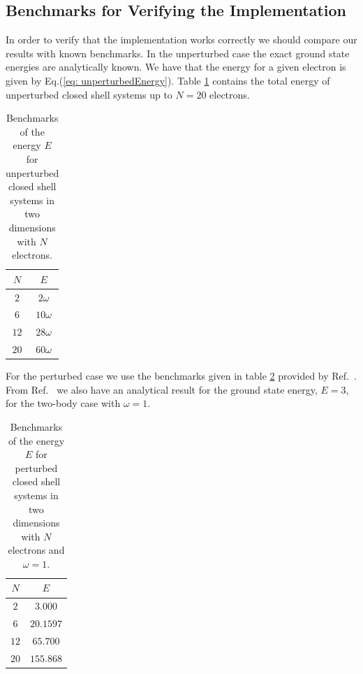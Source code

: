 \documentclass[../main.tex]{subfiles}
\begin{document}
\subsection{Benchmarks for Verifying the Implementation}
In order to verify that the implementation works correctly we should compare our results with known benchmarks. In the unperturbed case the exact ground state energies are analytically known. We have that the energy for a given electron is given by Eq.(\ref{eq: unperturbedEnergy}). Table \ref{tab: unperturbedEnergies} contains the total energy of unperturbed closed shell systems up to $N=20$ electrons.
\begin{table}[!ht]
  \centering
  \begin{tabular}{ | c | c | }
    \hline
     $N$ & $E$ \\*
    \hline
     $2$ & $2\omega$ \\*
    \hline
     $6$ & $10\omega$ \\*
    \hline
    $12$ & $28\omega$ \\*
    \hline
    $20$ & $60\omega$ \\*
    \hline
  \end{tabular}
  \caption{Benchmarks of the energy $E$ for unperturbed closed shell systems in two dimensions with $N$ electrons.}
  \label{tab: unperturbedEnergies}
\end{table}

For the perturbed case we use the benchmarks given in table \ref{tab: perturbedEnergies} provided by Ref.~\cite{QDotBenchmarks}. From Ref.~\cite{Taut} we also have an analytical result for the ground state energy, $E=3$, for the two-body case with $\omega=1$.
\begin{table}[!ht]
  \centering
  \begin{tabular}{ | c | c | }
    \hline
     $N$ & $E$ \\*
    \hline
     $2$ & $3.000$ \\*
    \hline
     $6$ & $20.1597$ \\*
    \hline
    $12$ & $65.700$ \\*
    \hline
    $20$ & $155.868$ \\*
    \hline
  \end{tabular}
  \caption{Benchmarks of the energy $E$ for perturbed closed shell systems in two dimensions with $N$ electrons and $\omega=1$.}
  \label{tab: perturbedEnergies}
\end{table}
\end{document}
